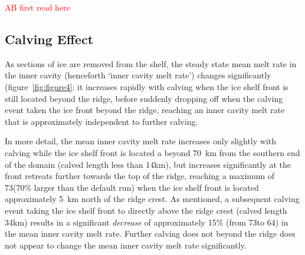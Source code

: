 \documentclass[draft]{agujournal2019}
\newcommand{\red}[1]{\textcolor{red}{#1}}
\begin{document}
\red{AB first read here}
\subsection{Calving Effect}
As sections of ice are removed from the shelf, the steady state mean melt rate in the inner cavity (henceforth `inner cavity melt rate') changes significantly (figure~\ref{fig:figure4}: it increases rapidly with calving when the ice shelf front is still located beyond the ridge, before suddenly dropping off when the calving event taken the ice front beyond the ridge, reaching an inner cavity melt rate that is approximately independent to further calving. 

In more detail, the mean inner cavity melt rate increases only slightly with calving while the ice shelf front is located a beyond 70~km from the southern end of the domain (calved length less than 14km), but increases significantly at the front retreats further towards the top of the ridge, reaching a maximum of 73\mpryr (70\% larger than the default run) when the ice shelf front is located approximately 5~km north of the ridge crest. As mentioned, a subsequent calving event taking the ice shelf front to directly above the ridge crest (calved length 34km) results in a significant \textit{decrease} of approximately 15$\%$ (from 73\mpryr to 64\mpryr) in the mean inner cavity melt rate. Further calving does not beyond the ridge does not appear to change the mean inner cavity melt rate significantly.
\end{document}
